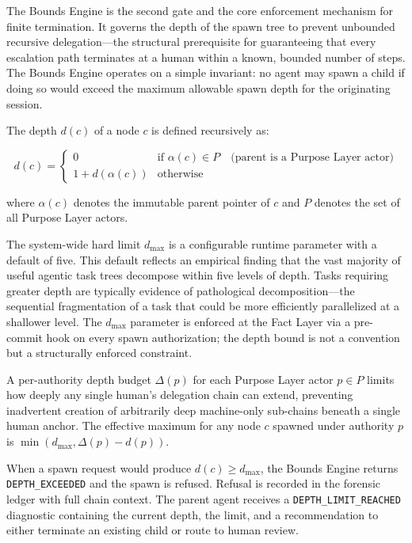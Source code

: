 The Bounds Engine is the second gate and the core enforcement mechanism for finite termination. It governs the depth of the spawn tree to prevent unbounded recursive delegation---the structural prerequisite for guaranteeing that every escalation path terminates at a human within a known, bounded number of steps. The Bounds Engine operates on a simple invariant: no agent may spawn a child if doing so would exceed the maximum allowable spawn depth for the originating session.

The depth $d(c)$ of a node $c$ is defined recursively as:

\begin{equation}
d(c) =
\begin{cases}
0 & \text{if } \alpha(c) \in P \quad \text{(parent is a Purpose Layer actor)} \\
1 + d(\alpha(c)) & \text{otherwise}
\end{cases}
\tag{1}
\end{equation}

where $\alpha(c)$ denotes the immutable parent pointer of $c$ and $P$ denotes the set of all Purpose Layer actors.


The system-wide hard limit $d_{\max}$ is a configurable runtime parameter with a default of five. This default reflects an empirical finding that the vast majority of useful agentic task trees decompose within five levels of depth. Tasks requiring greater depth are typically evidence of pathological decomposition---the sequential fragmentation of a task that could be more efficiently parallelized at a shallower level. The $d_{\max}$ parameter is enforced at the Fact Layer via a pre-commit hook on every spawn authorization; the depth bound is not a convention but a structurally enforced constraint.

A per-authority depth budget $\Delta(p)$ for each Purpose Layer actor $p \in P$ limits how deeply any single human's delegation chain can extend, preventing inadvertent creation of arbitrarily deep machine-only sub-chains beneath a single human anchor. The effective maximum for any node $c$ spawned under authority $p$ is $\min(d_{\max}, \Delta(p) - d(p))$.


When a spawn request would produce $d(c) \geq d_{\max}$, the Bounds Engine returns \texttt{DEPTH\_EXCEEDED} and the spawn is refused. Refusal is recorded in the forensic ledger with full chain context. The parent agent receives a \texttt{DEPTH\_LIMIT\_REACHED} diagnostic containing the current depth, the limit, and a recommendation to either terminate an existing child or route to human review.

